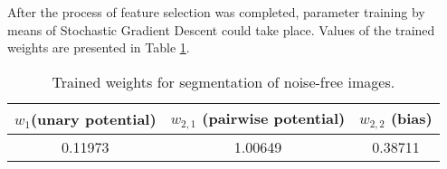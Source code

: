 After the process of feature selection was completed, parameter training by means of Stochastic Gradient Descent could take place. Values of the trained weights are presented in Table \ref{table:weights_nonlinear_noise_free}.
\begin{table}[ht]
\caption{Trained weights for segmentation of noise-free images.}
\centering
\begin{tabular}{|c|c|c|}
\hline
\rowcolor[HTML]{cecaca} 
$w_1$(unary potential) & $w_{2,1}$ (pairwise potential) & $w_{2,2}$ (bias) \\ \hline
0.11973 & 1.00649 & 0.38711 \\ \hline
\end{tabular}
\label{table:weights_nonlinear_noise_free}
\end{table}

